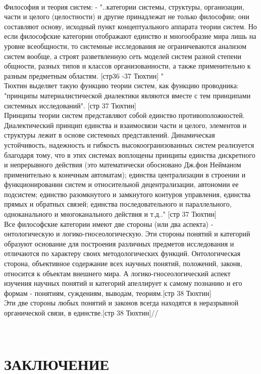 \documentclass[a4paper,12pt]{report}
\begin{document}
\\Философия и теория систем: - "..категории системы, структуры, организации, части и целого (целостности) и другие принадлежат не только философии; они составляют основу, исходный пункт концептуального аппарата теории систем. Но если философские категории отображают единство и многообразие мира лишь на уровне всеобщности, то системные исследования не ограничеваются анализом систем вообще, а строят разветвленную сеть моделей систем разной степени общности, разных типов и классов организованности, а также применительно к разным предметным областям. [стр36 -37 Тюхтин] "\\
Тюхтин выделяет такую функцию теории систем, как функцию проводника: "принципы материалистической диалектики являются вместе с тем принципами системных исследований". [стр 37 Тюхтин]\\
Принципы теории систем представляют собой единство противоположностей. Диалектический принцип единства и взаимосвязи части и целого, элементов и структуры лежит в основе системных представлений. Динамическая устойчивость, надежность и гибкость высокоогранизованных систем реализуется благодаря тому, что в этих системах воплощены принципы единства дискретного и непрерывного действия (это математически обосновано Дж.фон Нейманом применительно к конечным автоматам); единства централизации в строении и функционировании систем и относительной децентрализации, автономии ее подсистем; единство разомкнутого и замкнутого контуров управления, единства прямых и обратных связей; единства последовательного и параллельного, одноканального и многоканального действия и т.д.." [стр 37 Тюхтин]\\
Все философские категории имеют две стороны (или два аспекта) - онтологическую и логико-гносеологическую. Эти стороны понятий и категорий образуют основание для построения различных предметов исследования и отличаются по характеру своих методологических функций. Онтологическая сторона, объективное содержание всех научных понятий, положений, законв, относится к объектам внешнего мира. А логико-гносеологический аспект изучения научных понятий и категорий апеллирует к самому познанию и его формам - понятиям, суждениям, выводам, теориям.[стр 38 Тюхтин]\\
Эти две стороны любых понятий и законов всегда находятся в неразрывной органической связи, в единстве.[стр 38 Тюхтин]// 


\\

\chapter*{ЗАКЛЮЧЕНИЕ }
 \\
\end{document}
